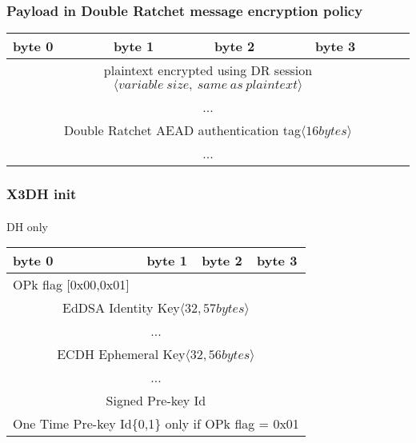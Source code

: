 \documentclass[a4paper,11pt]{article}
\begin{document}
      \subsubsection{Payload in Double Ratchet message encryption policy}
      \begin{center}
      \begin{tabular}{ | p{1.4in} | p{1.4in} | p{1.4in} | p{1.4in} |}
        \hline
        \cellcolor[gray]{0.85} byte 0 & \cellcolor[gray]{0.85} byte 1 & \cellcolor[gray]{0.85} byte 2 & \cellcolor[gray]{0.85}byte 3\\
        \hline
        \multicolumn{4}{|c|}{plaintext encrypted using DR session$\langle variable\ size,\ same\ as\ plaintext\rangle $}\\
        \multicolumn{4}{|c|}{...}\\
        \hline
        \multicolumn{4}{|c|}{Double Ratchet AEAD authentication tag$\langle 16bytes\rangle $}\\
        \multicolumn{4}{|c|}{...}\\
        \hline
      \end{tabular}
      \end{center}

      \subsubsection{X3DH init}
      \paragraph*{}DH only
      \begin{center}
      \begin{tabular}{ | p{1.4in} | p{1.4in} | p{1.4in} | p{1.4in} |}
        \hline
        \cellcolor[gray]{0.85} byte 0 & \cellcolor[gray]{0.85} byte 1 & \cellcolor[gray]{0.85} byte 2 & \cellcolor[gray]{0.85}byte 3\\
        \hline
        OPk flag [0x00,0x01]&\multicolumn{3}{|c|}{}\\
        \cline{1-1}
        \multicolumn{4}{|c|}{EdDSA Identity Key$\langle 32,57bytes\rangle $}\\
        \multicolumn{4}{|c|}{...}\\
        \hline
        \multicolumn{4}{|c|}{ ECDH Ephemeral Key$\langle 32,56bytes\rangle $}\\
        \multicolumn{4}{|c|}{...}\\
        \hline
        \multicolumn{4}{|c|}{Signed Pre-key Id}\\
        \hline
        \multicolumn{4}{|c|}{One Time Pre-key Id\{0,1\} only if OPk flag = 0x01}\\
        \hline
      \end{tabular}
      \end{center}
      
\end{document}
